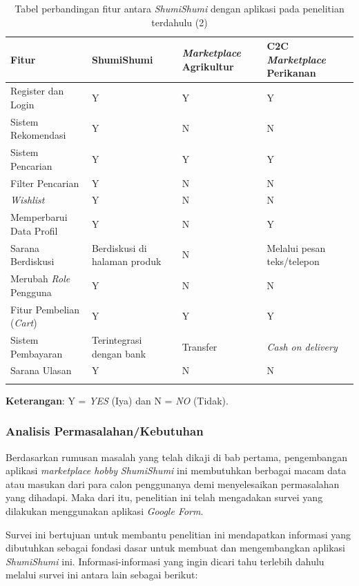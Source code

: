 \documentclass[a4paper]{article}
\newcommand{\subsubbab}[1]{%
    \subsubsection{#1}%
}
\begin{document}
\begin{longtable}{|p{3cm}|p{2cm}|p{3cm}|p{4cm}|}
    \hline
    Fitur & ShumiShumi & \textit{Marketplace} Agrikultur & C2C \textit{Marketplace} Perikanan\\
    \hline
    Register dan Login & Y & Y & Y\\
    \hline
    Sistem Rekomendasi & Y & N & N\\
    \hline
    Sistem Pencarian & Y & Y & Y\\
    \hline
    Filter Pencarian & Y & N & N\\
    \hline
    \textit{Wishlist} & Y & N & N\\
    \hline
    Memperbarui Data Profil & Y & N & Y\\
    \hline
    Sarana Berdiskusi & Berdiskusi di halaman produk & N & Melalui pesan teks/telepon\\
    \hline
    Merubah \textit{Role} Pengguna & Y & N & N\\
    \hline
    Fitur Pembelian (\textit{Cart}) & Y & Y & Y\\
    \hline
    Sistem Pembayaran & Terintegrasi dengan bank & Transfer & \textit{Cash on delivery}\\
    \hline
    Sarana Ulasan & Y & N & N\\
    \hline
    \caption{Tabel perbandingan fitur antara \textit{ShumiShumi} dengan aplikasi pada penelitian terdahulu (2)}
\end{longtable}

\textbf{Keterangan}: Y = \textit{YES} (Iya) dan N = \textit{NO} (Tidak).

\subsubbab{Analisis Permasalahan/Kebutuhan}
Berdasarkan rumusan masalah yang telah dikaji di bab pertama, pengembangan aplikasi \textit{marketplace hobby} \textit{ShumiShumi} ini membutuhkan berbagai macam data atau masukan dari para calon penggunanya demi menyelesaikan permasalahan yang dihadapi. Maka dari itu, penelitian ini telah mengadakan survei yang dilakukan menggunakan aplikasi \textit{Google Form}.

Survei ini bertujuan untuk membantu penelitian ini mendapatkan informasi yang dibutuhkan sebagai fondasi dasar untuk membuat dan mengembangkan aplikasi \textit{ShumiShumi} ini. Informasi-informasi yang ingin dicari tahu terlebih dahulu melalui survei ini antara lain sebagai berikut:
\end{document}
